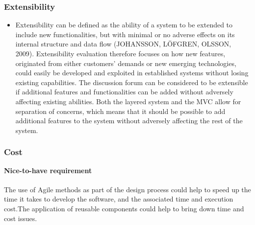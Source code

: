 \documentclass[a4paper]{article}
\begin{document}
\subsubsection{Extensibility}
\begin{itemize}                        i                                                                                         I                                                                                                                                                                                                                                                                                                   it is requi                                                  available ar                                                             previously stipulated        r                                                  bsubsectionextbf{Architectural pattern associated with this requirement:} Layered architectural pattern in conjunction with the model-view-controller pattern 
	\item Extensibility can be defined as the ability of a system to be extended to include new functionalities, but with minimal or no adverse effects on its internal structure and data flow (JOHANSSON, LÖFGREN, OLSSON, 2009).  Extensibility evaluation therefore focuses on how new features, originated from either customers’ demands or new emerging technologies, could easily be developed and exploited in established systems without losing existing capabilities. The discussion forum can be considered to be extensible if additional features and functionalities can be added without adversely affecting existing abilities. Both the layered system and the MVC allow for separation of concerns, which means that it should be possible to add additional features to the system without adversely affecting the rest of the system.
\end{itemize}              
                           

\subsubsection{Cost}
\textbf{Nice-to-have requirement}
\\
\\The use of Agile methods as part of the design process could help to speed up the time it takes to develop the software, and the associated time and execution cost.The application of reusable components could help to bring down time and cost issues. 
\end{document}
